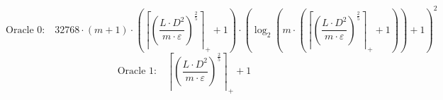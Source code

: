 \[\text{Oracle 0:}\quad 32768 \cdot \left(m + 1\right) \cdot \left(\left\lceil \left(\frac{L \cdot D^{2}}{m \cdot \varepsilon}\right)^{\frac{2}{5}} \right\rceil_{+} + 1\right) \cdot \left(\log_{2}\left(m \cdot \left(\left\lceil \left(\frac{L \cdot D^{2}}{m \cdot \varepsilon}\right)^{\frac{2}{5}} \right\rceil_{+} + 1\right)\right) + 1\right)^{2}\]
\[\text{Oracle 1:}\quad \left\lceil \left(\frac{L \cdot D^{2}}{m \cdot \varepsilon}\right)^{\frac{2}{5}} \right\rceil_{+} + 1\]
